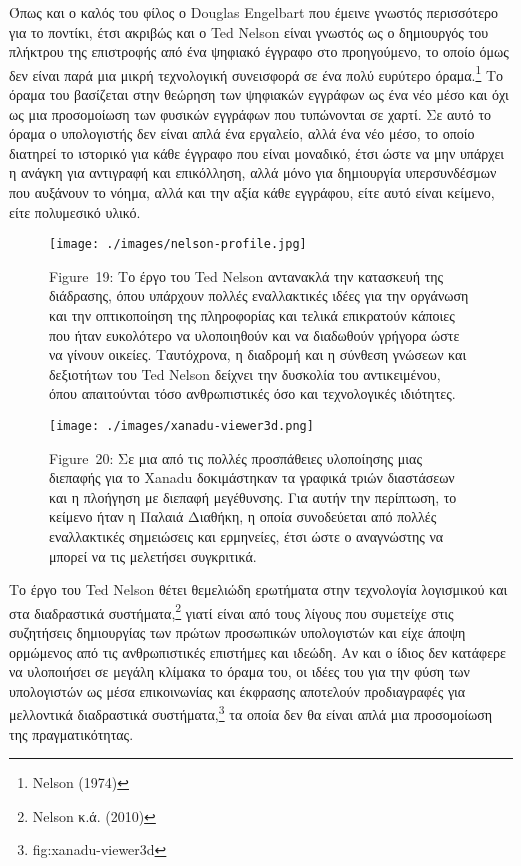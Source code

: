 \documentclass[
]{article}
\begin{document}
Όπως και ο καλός του φίλος ο Douglas Engelbart που έμεινε γνωστός
περισσότερο για το ποντίκι, έτσι ακριβώς και ο Ted Nelson είναι γνωστός
ως ο δημιουργός του πλήκτρου της επιστροφής από ένα ψηφιακό έγγραφο στο
προηγούμενο, το οποίο όμως δεν είναι παρά μια μικρή τεχνολογική
συνεισφορά σε ένα πολύ ευρύτερο όραμα.\footnote{Nelson (1974)} Το όραμα
του βασίζεται στην θεώρηση των ψηφιακών εγγράφων ως ένα νέο μέσο και όχι
ως μια προσομοίωση των φυσικών εγγράφων που τυπώνονται σε χαρτί. Σε αυτό
το όραμα ο υπολογιστής δεν είναι απλά ένα εργαλείο, αλλά ένα νέο μέσο,
το οποίο διατηρεί το ιστορικό για κάθε έγγραφο που είναι μοναδικό, έτσι
ώστε να μην υπάρχει η ανάγκη για αντιγραφή και επικόλληση, αλλά μόνο για
δημιουργία υπερσυνδέσμων που αυξάνουν το νόημα, αλλά και την αξία κάθε
εγγράφου, είτε αυτό είναι κείμενο, είτε πολυμεσικό υλικό.

\leavevmode{}%
\begin{figure}
\hypertarget{fig:nelson-profile}{%
\centering
\texttt{[image: ./images/nelson-profile.jpg]}
\caption{Figure~19: Το έργο του Ted Nelson αντανακλά την κατασκευή της
διάδρασης, όπου υπάρχουν πολλές εναλλακτικές ιδέες για την οργάνωση και
την οπτικοποίηση της πληροφορίας και τελικά επικρατούν κάποιες που ήταν
ευκολότερο να υλοποιηθούν και να διαδωθούν γρήγορα ώστε να γίνουν
οικείες. Ταυτόχρονα, η διαδρομή και η σύνθεση γνώσεων και δεξιοτήτων του
Ted Nelson δείχνει την δυσκολία του αντικειμένου, όπου απαιτούνται τόσο
ανθρωπιστικές όσο και τεχνολογικές ιδιότητες.}\label{fig:nelson-profile}
}
\end{figure}

\leavevmode{}%
\begin{figure}
\hypertarget{fig:xanadu-viewer3d}{%
\centering
\texttt{[image: ./images/xanadu-viewer3d.png]}
\caption{Figure~20: Σε μια από τις πολλές προσπάθειες υλοποίησης μιας
διεπαφής για το Xanadu δοκιμάστηκαν τα γραφικά τριών διαστάσεων και η
πλοήγηση με διεπαφή μεγέθυνσης. Για αυτήν την περίπτωση, το κείμενο ήταν
η Παλαιά Διαθήκη, η οποία συνοδεύεται από πολλές εναλλακτικές σημειώσεις
και ερμηνείες, έτσι ώστε ο αναγνώστης να μπορεί να τις μελετήσει
συγκριτικά.}\label{fig:xanadu-viewer3d}
}
\end{figure}

Το έργο του Ted Nelson θέτει θεμελιώδη ερωτήματα στην τεχνολογία
λογισμικού και στα διαδραστικά συστήματα,\footnote{Nelson κ.ά. (2010)}
γιατί είναι από τους λίγους που συμετείχε στις συζητήσεις δημιουργίας
των πρώτων προσωπικών υπολογιστών και είχε άποψη ορμώμενος από τις
ανθρωπιστικές επιστήμες και ιδεώδη. Αν και ο ίδιος δεν κατάφερε να
υλοποιήσει σε μεγάλη κλίμακα το όραμα του, οι ιδέες του για την φύση των
υπολογιστών ως μέσα επικοινωνίας και έκφρασης αποτελούν προδιαγραφές για
μελλοντικά διαδραστικά συστήματα,\footnote{fig:xanadu-viewer3d} τα οποία
δεν θα είναι απλά μια προσομοίωση της πραγματικότητας.
\end{document}
